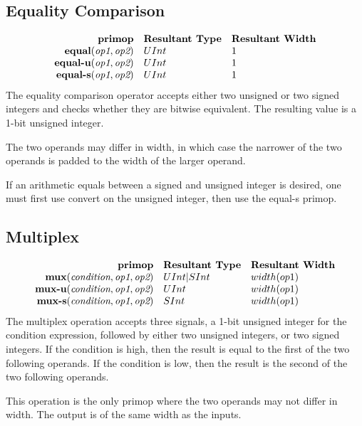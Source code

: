 \documentclass[12pt]{article}
\begin{document}
\subsection{Equality Comparison}
\[
\begin{array}{rll}
\text{\bf primop} & \text{\bf Resultant Type} & \text{\bf Resultant Width} \\
\text{\bf equal}  (\text{\em op1}, \text{\em op2})     & UInt & 1 \\
\text{\bf equal-u}(\text{\em op1}, \text{\em op2})     & UInt & 1 \\
\text{\bf equal-s}(\text{\em op1}, \text{\em op2})     & UInt & 1 \\
\end{array}
\]
The equality comparison operator accepts either two unsigned or two signed integers and checks whether they are bitwise equivalent.
The resulting value is a 1-bit unsigned integer. 

The two operands may differ in width, in which case the narrower of the two operands is padded to the width of the larger operand.

If an arithmetic equals between a signed and unsigned integer is desired, one must first use convert on the unsigned integer, then use the equal-s primop.

\subsection{Multiplex}
\[
\begin{array}{rll}
\text{\bf primop} & \text{\bf Resultant Type} & \text{\bf Resultant Width} \\
\text{\bf mux}  (\text{\em condition}, \text{\em op1}, \text{\em op2}) & UInt|SInt & width(op1) \\
\text{\bf mux-u}(\text{\em condition}, \text{\em op1}, \text{\em op2}) & UInt & width(op1) \\
\text{\bf mux-s}(\text{\em condition}, \text{\em op1}, \text{\em op2}) & SInt & width(op1) \\
\end{array}
\]
The multiplex operation accepts three signals, a 1-bit unsigned integer for the condition expression, followed by either two unsigned integers, or two signed integers.
If the condition is high, then the result is equal to the first of the two following operands.
If the condition is low, then the result is the second of the two following operands. 

This operation is the only primop where the two operands may not differ in width. The output is of the same width as the inputs.
\end{document}
